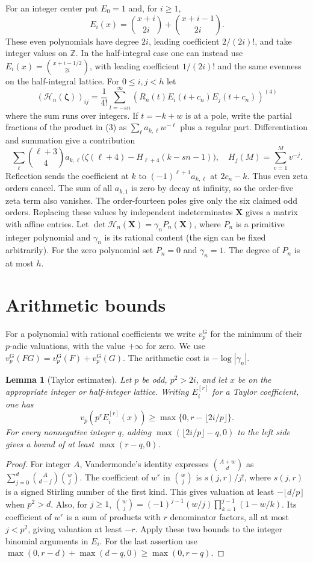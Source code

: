 \IfFileExists{TS1cmr.fd}{\documentclass[11pt]{article}}
\newtheorem{lemma}[theorem]{Lemma}
\newcommand{\vp}{v_p}
\newcommand{\vg}{v_p^{\mathrm G}}
\newcommand{\Z}{\mathbb Z}
\begin{document}
For an integer center put \(E_0=1\) and, for \(i\ge1\),
\[
 E_i(x)=\binom{x+i}{2i}+\binom{x+i-1}{2i}.
\]
These even polynomials have degree \(2i\), leading coefficient
\(2/(2i)!\), and take integer values on \(\Z\).
In the half-integral case one can instead use
\(E_i(x)=\binom{x+i-1/2}{2i}\), with leading coefficient \(1/(2i)!\)
and the same evenness on the half-integral lattice.
For \(0\le i,j<h\) let
\[
 (\mathcal H_n(\boldsymbol\zeta))_{ij}
 =\frac1{4!}\sum_{t=-sn}^{\infty}
   (R_n(t)E_i(t+c_n)E_j(t+c_n))^{(4)}
 \tag{3}
\]
where the sum runs over integers. If \(t=-k+w\) is at a pole,
write the partial fractions of the product in (3) as
\(\sum_{\ell}a_{k,\ell}w^{-\ell}\) plus a regular part.
Differentiation and summation give a contribution
\[
 \sum_\ell \binom{\ell+3}{4}a_{k,\ell}
       \bigl(\zeta(\ell+4)-H_{\ell+4}(k-sn-1)\bigr),
 \quad H_j(M)=\sum_{v=1}^{M}v^{-j}.
 \tag{4}
\]
Reflection sends the coefficient at \(k\) to
\((-1)^{\ell+1}a_{k,\ell}\) at \(2c_n-k\). Thus even zeta orders
cancel. The sum of all \(a_{k,1}\) is zero by decay at infinity,
so the order-five zeta term also vanishes. The order-fourteen
poles give only the six claimed odd orders. Replacing these values
by independent indeterminates \(\mathbf X\) gives a matrix with
affine entries. Let
\(\det\mathcal H_n(\mathbf X)=\gamma_n P_n(\mathbf X)\), where
\(P_n\) is a primitive integer polynomial and \(\gamma_n\) is its
rational content (the sign can be fixed arbitrarily). For the zero
polynomial set \(P_n=0\) and \(\gamma_n=1\). The degree of \(P_n\)
is at most \(h\).

\section{Arithmetic bounds}
For a polynomial with rational coefficients we write \(\vg\)
for the minimum of their \(p\)-adic valuations, with the value
\(+\infty\) for zero. We use \(\vg(FG)=\vg(F)+\vg(G)\).
The arithmetic cost is \(-\log|\gamma_n|\).

\begin{lemma}[Taylor estimates]
Let \(p\) be odd, \(p^2>2i\), and let \(x\) be on the appropriate
integer or half-integer lattice. Writing \(E_i^{[r]}\) for a Taylor
coefficient, one has
\[
 \vp(p^r E_i^{[r]}(x))\ge
          \max\{0,r-\lfloor 2i/p\rfloor\}.
 \tag{5}
\]
For every nonnegative integer \(q\), adding
\(\max(\lfloor 2i/p\rfloor-q,0)\) to the left side gives a bound
of at least \(\max(r-q,0)\).
\end{lemma}
\begin{proof}
For integer \(A\), Vandermonde's identity expresses
\(\binom{A+w}{d}\) as \(\sum_{j=0}^d\binom A{d-j}\binom wj\).
The coefficient of \(w^r\) in \(\binom wj\) is \(s(j,r)/j!\),
where \(s(j,r)\) is a signed Stirling number of the first kind.
This gives valuation at least \(-\lfloor d/p\rfloor\) when
\(p^2>d\). Also, for \(j\ge1\),
\(\binom wj=(-1)^{j-1}(w/j)\prod_{k=1}^{j-1}(1-w/k)\).
Its coefficient of \(w^r\) is a sum of products with \(r\)
denominator factors, all at most \(j<p^2\), giving valuation at
least \(-r\). Apply these two bounds to the integer binomial
arguments in \(E_i\). For the last assertion use
\(\max(0,r-d)+\max(d-q,0)\ge\max(0,r-q)\).
\end{proof}
\end{document}

